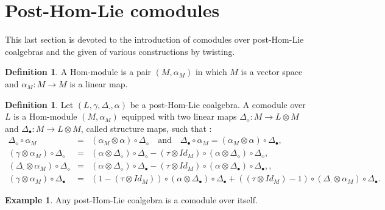 \documentclass{article}
\theoremstyle{definition}
\newtheorem{defn}[thm]{Definition}
\newtheorem{exam}[thm]{Example}
\theoremstyle{remark}
\numberwithin{equation}{section}
\begin{document}
\section{Post-Hom-Lie comodules}
 This last section is devoted to the  introduction of comodules over post-Hom-Lie coalgebras and the given of various constructions by twisting.
\begin{defn}
 A Hom-module is a pair $(M,\alpha_M)$ in which $M$ is a vector space and $\alpha_M: M\longrightarrow M$ is a linear map.
\end{defn}
\begin{defn}
Let $(L, \gamma, \Delta_\cdot, \alpha)$ be a post-Hom-Lie coalgebra. A comodule over $L$ is a Hom-module $(M, \alpha_M)$ equipped with two
linear maps $\Delta_\diamond :  M\rightarrow L\otimes M$ and $\Delta_\bullet : M\rightarrow L\otimes M$, called structure maps, such that :
 \begin{eqnarray}
  \Delta_\diamond\circ\alpha_M&=&(\alpha_M\otimes\alpha)\circ\Delta_\diamond\quad\mbox{and}\quad\Delta_\bullet\circ\alpha_M=(\alpha_M\otimes\alpha)\circ\Delta_\bullet,\label{ma1}\\
(\gamma\otimes\alpha_M)\circ\Delta_\diamond&=&(\alpha\otimes\Delta_\diamond)\circ\Delta_\diamond-(\tau\otimes Id_M)\circ(\alpha\otimes\Delta_\diamond)\circ\Delta_\diamond,\label{ma2}\\
(\Delta_\cdot\otimes\alpha_M)\circ\Delta_\diamond&=&(\alpha\otimes\Delta_\diamond)\circ\Delta_\bullet-(\tau\otimes Id_M)\circ(\alpha\otimes\Delta_\bullet)\circ\Delta_\bullet,\label{ma3},\\
(\gamma\otimes\alpha_M)\circ\Delta_\bullet&=&(1-(\tau\otimes Id_M))\circ(\alpha\otimes\Delta_\bullet)\circ\Delta_\bullet+((\tau\otimes Id_M)-1)\circ(\Delta_\cdot\otimes\alpha_M)\circ\Delta_\bullet\label{ma4}.
\end{eqnarray}

\end{defn}
\begin{exam}
 Any post-Hom-Lie coalgebra is a comodule over itself.
\end{exam}
\end{document}
